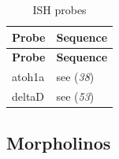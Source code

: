 \documentclass[11pt,singlespacinge,twoside]{reedthesis} %
\theoremstyle{definition}
\theoremstyle{definition}
\theoremstyle{definition}
\theoremstyle{remark}
\begin{document}
\begin{longtable}[]{@{}ll@{}}
\caption{\label{tab:mat-probes} ISH probes}\tabularnewline
\toprule
\begin{minipage}[b]{0.11\columnwidth}\raggedright
\textbf{Probe}\strut
\end{minipage} & \begin{minipage}[b]{0.83\columnwidth}\raggedright
\textbf{Sequence}\strut
\end{minipage}\tabularnewline
\midrule
\endfirsthead
\toprule
\begin{minipage}[b]{0.11\columnwidth}\raggedright
\textbf{Probe}\strut
\end{minipage} & \begin{minipage}[b]{0.83\columnwidth}\raggedright
\textbf{Sequence}\strut
\end{minipage}\tabularnewline
\midrule
\endhead
\begin{minipage}[t]{0.11\columnwidth}\raggedright
atoh1a\strut
\end{minipage} & \begin{minipage}[t]{0.83\columnwidth}\raggedright
see (\emph{38})\strut
\end{minipage}\tabularnewline
\begin{minipage}[t]{0.11\columnwidth}\raggedright
deltaD\strut
\end{minipage} & \begin{minipage}[t]{0.83\columnwidth}\raggedright
see (\emph{53})\strut
\end{minipage}\tabularnewline
\bottomrule
\end{longtable}
\hypertarget{mat-mos}{%
\subsection{Morpholinos}\label{mat-mos}}
\end{document}
